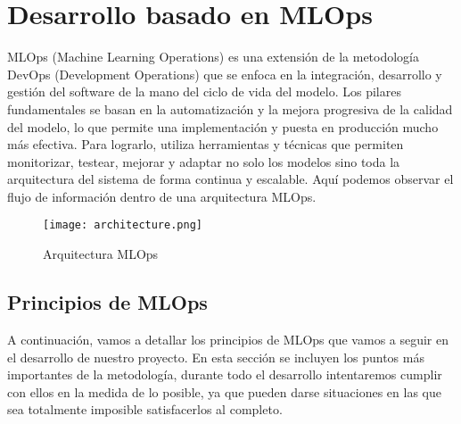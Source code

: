 \section{Desarrollo basado en MLOps}
    MLOps (Machine Learning Operations) es una extensión de la metodología DevOps (Development Operations)
    que se enfoca en la integración, desarrollo y gestión del software de la mano del ciclo de vida del modelo.
    Los pilares fundamentales se basan en la automatización y la mejora progresiva de la calidad del modelo, 
    lo que permite una implementación y puesta en producción mucho más efectiva. Para lograrlo, utiliza herramientas 
    y técnicas que permiten monitorizar, testear, mejorar y adaptar no solo los modelos sino toda la arquitectura
    del sistema de forma continua y escalable. Aquí podemos observar el flujo de información dentro de una 
    arquitectura MLOps. 

    \begin{figure}[ht]
        \centering
        \texttt{[image: architecture.png]}
        \caption{Arquitectura MLOps}
        \label{fig:architecure-mlops}
    \end{figure}

    \subsection{Principios de MLOps}
    A continuación, vamos a detallar los principios de MLOps que vamos a seguir en el desarrollo de nuestro proyecto.
    En esta sección se incluyen los puntos más importantes de la metodología, durante todo el desarrollo intentaremos
    cumplir con ellos en la medida de lo posible, ya que pueden darse situaciones en las que sea totalmente imposible
    satisfacerlos al completo.

